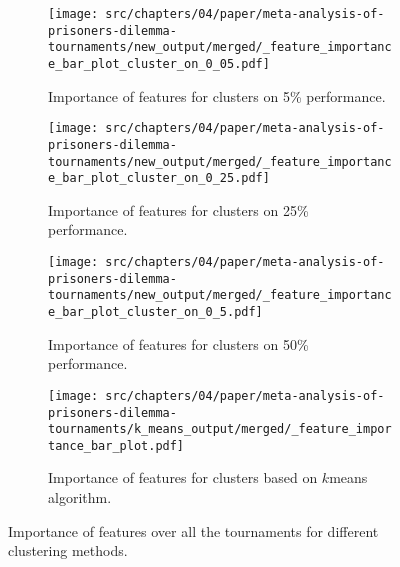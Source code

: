 \begin{figure}[!htbp]
    \begin{subfigure}[t]{0.5\textwidth}
        \begin{center}
            \texttt{[image: src/chapters/04/paper/meta-analysis-of-prisoners-dilemma-tournaments/new\_output/merged/\_feature\_importance\_bar\_plot\_cluster\_on\_0\_05.pdf]}
        \end{center}
        \caption{Importance of features for clusters on 5\% performance.}
    \end{subfigure}
    \begin{subfigure}[t]{0.5\textwidth}
        \begin{center}
            \texttt{[image: src/chapters/04/paper/meta-analysis-of-prisoners-dilemma-tournaments/new\_output/merged/\_feature\_importance\_bar\_plot\_cluster\_on\_0\_25.pdf]}
        \end{center}
        \caption{Importance of features for clusters on 25\% performance.}
    \end{subfigure}
    \begin{subfigure}[t]{0.5\textwidth}
        \begin{center}
            \texttt{[image: src/chapters/04/paper/meta-analysis-of-prisoners-dilemma-tournaments/new\_output/merged/\_feature\_importance\_bar\_plot\_cluster\_on\_0\_5.pdf]}
        \end{center}
        \caption{Importance of features for clusters on 50\% performance.}
    \end{subfigure}
    \begin{subfigure}[t]{0.5\textwidth}
        \begin{center}
            \texttt{[image: src/chapters/04/paper/meta-analysis-of-prisoners-dilemma-tournaments/k\_means\_output/merged/\_feature\_importance\_bar\_plot.pdf]}
        \end{center}
        \caption{Importance of features for clusters based on \(k\)means algorithm.}
    \end{subfigure}
    \caption{Importance of features over all the tournaments for different
    clustering methods.}\label{fig:clustering_importance_overall}
\end{figure}